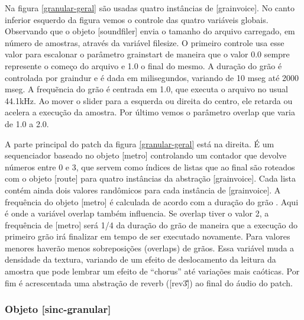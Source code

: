 \documentclass{ppgmus}
\begin{document}
Na figura \ref{granular-geral} são usadas quatro instâncias de [grainvoice]. No canto inferior esquerdo da figura
vemos o controle das quatro variáveis globais. Observando que o objeto [soundfiler] envia o tamanho do arquivo
carregado, em número de amostras, através da variável filesize. O primeiro controle usa esse valor para escalonar
o parâmetro grainstart de maneira que o valor 0.0 sempre represente o começo do arquivo e 1.0 o final do mesmo.
A duração do grão é controlada por graindur e é dada em milisegundos, variando de 10 mseg até 2000 mseg.
A frequẽncia do grão é centrada em 1.0, que executa o arquivo no usual 44.1kHz. Ao mover o slider para a esquerda
ou direita do centro, ele retarda ou acelera a execução da amostra. Por último vemos o parâmetro overlap que varia de
1.0 a 2.0.

A parte principal do patch da figura \ref{granular-geral} está na direita. É um sequenciador baseado no objeto
[metro] controlando um contador que devolve números entre 0 e 3, que servem como índices de listas que ao final
são roteados com o objeto [route] para quatro instâncias da abstração [grainvoice]. Cada lista contém ainda dois
valores randômicos para cada instância de [grainvoice]. A frequência do objeto [metro] é calculada de acordo com a duração
do grão . Aqui é onde a variável
overlap também influencia. Se overlap tiver o valor 2, a frequência de [metro] será 1/4 da duração
do grão de maneira que a execução do primeiro grão irá finalizar em tempo de ser executado novamente.
Para valores menores haverão menos sobreposições (overlaps) de grãos. Essa variável muda a densidade da
textura, variando de um efeito de deslocamento da leitura da amostra que pode lembrar um efeito de 
``chorus'' até variações mais caóticas. Por fim é acrescentada uma abstração de reverb ([rev3\~]) ao final
do áudio do patch.



\subsubsection{Objeto [sinc-granular]}



\end{document}
